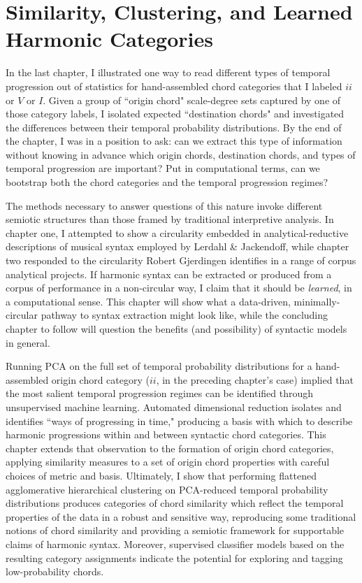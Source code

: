 \chapter{Similarity, Clustering, and Learned Harmonic Categories}
In the last chapter, I illustrated one way to read different types of temporal progression out of statistics for hand-assembled chord categories that I labeled $ii$ or $V$ or $I$.  Given a group of ``origin chord" scale-degree sets captured by one of those category labels, I isolated expected ``destination chords" and investigated the differences between their temporal probability distributions.  By the end of the chapter, I was in a position to ask: can we extract this type of information without knowing in advance which origin chords, destination chords, and types of temporal progression are important?  Put in computational terms, can we bootstrap both the chord categories and the temporal progression regimes?

The methods necessary to answer questions of this nature invoke different semiotic structures than those framed by traditional interpretive analysis.  In chapter one, I attempted to show a circularity embedded in analytical-reductive descriptions of musical syntax employed by Lerdahl \& Jackendoff, while chapter two responded to the circularity Robert Gjerdingen identifies in a range of corpus analytical projects.  If harmonic syntax can be extracted or produced from a corpus of performance in a non-circular way, I claim that it should be \emph{learned}, in a computational sense.  This chapter will show what a data-driven, minimally-circular pathway to syntax extraction might look like, while the concluding chapter to follow will question the benefits (and possibility) of syntactic models in general.

Running PCA on the full set of temporal probability distributions for a hand-assembled origin chord category ($ii$, in the preceding chapter's case) implied that the most salient temporal progression regimes can be identified through unsupervised machine learning.  Automated dimensional reduction isolates and identifies ``ways of progressing in time," producing a basis with which to describe harmonic progressions within and between syntactic chord categories.  This chapter extends that observation to the formation of origin chord categories, applying similarity measures to a set of origin chord properties with careful choices of metric and basis.  Ultimately, I show that performing flattened agglomerative hierarchical clustering on PCA-reduced temporal probability distributions produces categories of chord similarity which reflect the temporal properties of the data in a robust and sensitive way, reproducing some traditional notions of chord similarity and providing a semiotic framework for supportable claims of harmonic syntax.  Moreover, supervised classifier models based on the resulting category assignments indicate the potential for exploring and tagging low-probability chords.

